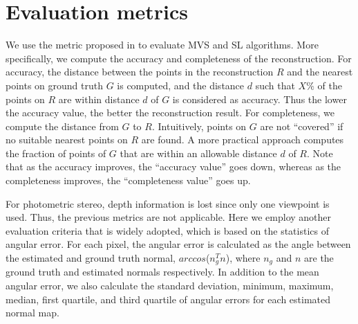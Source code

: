 \section{Evaluation metrics}
We use the metric proposed in \cite{seitz2006comparison} to evaluate MVS and SL algorithms. More specifically, we compute the accuracy and completeness of the reconstruction. For accuracy, the distance between the points in the reconstruction $R$ and the nearest points on ground truth $G$ is computed, and the distance $d$ such that $X\%$ of the points on $R$ are within distance $d$ of $G$ is considered as accuracy. Thus the lower the accuracy value, the better the reconstruction result. For completeness, we compute the distance from $G$ to $R$. Intuitively, points on $G$ are not ``covered'' if no suitable nearest points on $R$ are found. A more practical approach computes the fraction of points of $G$ that are within an allowable distance $d$ of $R$.
Note that as the accuracy improves, the ``accuracy value'' goes down, whereas as the completeness improves, the ``completeness value'' goes up.

For photometric stereo, depth information is lost since only one viewpoint is used. Thus, the previous metrics are not applicable. Here we employ another evaluation criteria that is widely adopted, which is based on the statistics of angular error. For each pixel, the angular error is calculated as the angle between the estimated and ground truth normal, \ie $arccos$($n_g^T n$), where $n_g$ and $n$ are the ground truth and estimated normals respectively. In addition to the mean angular error, we also calculate the standard deviation, minimum, maximum, median, first quartile, and third quartile of angular errors for each estimated normal map.

